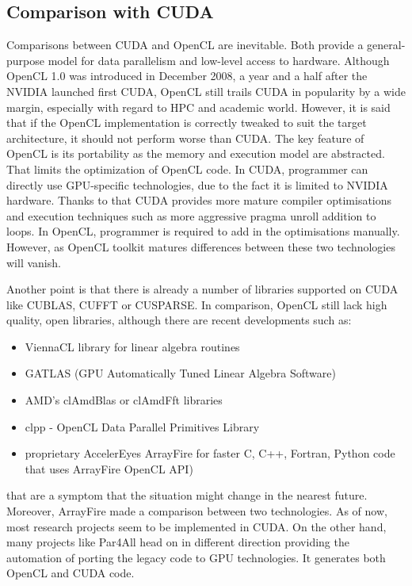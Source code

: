\subsection{Comparison with CUDA}
Comparisons between CUDA and OpenCL are inevitable. Both provide a general-purpose model for data parallelism and low-level access to hardware. Although OpenCL 1.0 was introduced in December 2008, a year and a half after the NVIDIA launched first CUDA, OpenCL still trails CUDA in popularity by a wide margin, especially with regard to HPC and academic world.\cite{hpcwire2012reserachers} However, it is said that if the OpenCL implementation is correctly tweaked to suit the target architecture, it should not perform worse than CUDA. The key feature of OpenCL is its portability as the memory and execution model are abstracted. That limits the optimization of OpenCL code. In CUDA, programmer can directly use GPU-specific technologies, due to the fact it is limited to NVIDIA hardware. Thanks to that CUDA provides more mature compiler optimisations and execution techniques such as more aggressive pragma unroll addition to loops. In OpenCL, programmer is required to add in the optimisations manually. However, as OpenCL toolkit matures differences between these two technologies will vanish.\cite{hpcwire2012openclgains, openclnews2012}

Another point is that there is already a number of libraries supported on CUDA like CUBLAS, CUFFT or CUSPARSE. In comparison, OpenCL still lack high quality, open libraries, although there are recent developments such as:

\begin{itemize}
\item ViennaCL library for linear algebra routines\cite{viennacl2012}
\item GATLAS (GPU Automatically Tuned Linear Algebra Software)\cite{gatlas2012}
\item AMD's clAmdBlas or clAmdFft libraries\cite{amd2012libs}
\item clpp - OpenCL Data Parallel Primitives Library\cite{clpp2012}
\item proprietary AccelerEyes ArrayFire for faster C, C++, Fortran, Python code that uses ArrayFire OpenCL API)
\end{itemize}
 
  that are a symptom that the situation might change in the nearest future. Moreover, ArrayFire made a comparison between two technologies.\cite{accelereyes2012vs} As of now, most research projects seem to be implemented in CUDA. On the other hand, many projects like Par4All\cite{par4all2012} head on in different direction providing the automation of porting the legacy code to GPU technologies. It generates both OpenCL and CUDA code. 

